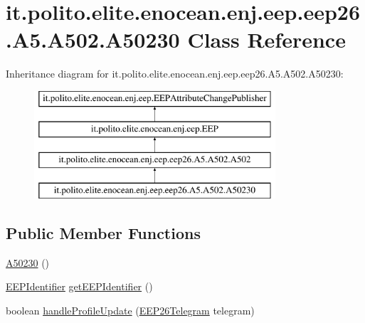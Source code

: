 \hypertarget{classit_1_1polito_1_1elite_1_1enocean_1_1enj_1_1eep_1_1eep26_1_1_a5_1_1_a502_1_1_a50230}{}\section{it.\+polito.\+elite.\+enocean.\+enj.\+eep.\+eep26.\+A5.\+A502.\+A50230 Class Reference}
\label{classit_1_1polito_1_1elite_1_1enocean_1_1enj_1_1eep_1_1eep26_1_1_a5_1_1_a502_1_1_a50230}
Inheritance diagram for it.\+polito.\+elite.\+enocean.\+enj.\+eep.\+eep26.\+A5.\+A502.\+A50230\+:\begin{figure}[H]
\begin{center}
\leavevmode
\includegraphics[height=4.000000cm]{classit_1_1polito_1_1elite_1_1enocean_1_1enj_1_1eep_1_1eep26_1_1_a5_1_1_a502_1_1_a50230}
\end{center}
\end{figure}
\subsection*{Public Member Functions}
\begin{DoxyCompactItemize}
\item 
\hyperlink{classit_1_1polito_1_1elite_1_1enocean_1_1enj_1_1eep_1_1eep26_1_1_a5_1_1_a502_1_1_a50230_a6367acf017ca1f7690b10d9ebea7a6bf}{A50230} ()
\item 
\hyperlink{classit_1_1polito_1_1elite_1_1enocean_1_1enj_1_1eep_1_1_e_e_p_identifier}{E\+E\+P\+Identifier} \hyperlink{classit_1_1polito_1_1elite_1_1enocean_1_1enj_1_1eep_1_1eep26_1_1_a5_1_1_a502_1_1_a50230_a4bbd2e1eee17a112c29e78588b56d059}{get\+E\+E\+P\+Identifier} ()
\item 
boolean \hyperlink{classit_1_1polito_1_1elite_1_1enocean_1_1enj_1_1eep_1_1eep26_1_1_a5_1_1_a502_1_1_a50230_a820065c8a7f3324967022dc62821b727}{handle\+Profile\+Update} (\hyperlink{classit_1_1polito_1_1elite_1_1enocean_1_1enj_1_1eep_1_1eep26_1_1telegram_1_1_e_e_p26_telegram}{E\+E\+P26\+Telegram} telegram)
\end{DoxyCompactItemize}
